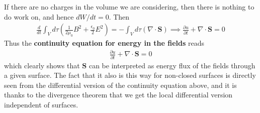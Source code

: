 \documentclass[a4paper]{article}
\begin{document}
    If there are no charges in the volume we are considering, then there is nothing to do work on, and hence \(dW / dt = 0\). Then 
    \begin{align*}
        \frac{d}{dt} \int_V d \tau \left( \frac{1}{2\mu _0} B^{2} + \frac{\epsilon_0}{2} E^{2}  \right) = - \int_V d \tau \left(\nabla \cdot \mathbf{S}\right) \implies \frac{\partial u}{\partial t} + \nabla \cdot \mathbf{S} = 0
    \end{align*}
    Thus the \textbf{continuity equation for energy in the fields} reads \begin{align*}
        \boxed{\frac{\partial u}{\partial t} + \nabla \cdot \mathbf{S} = 0} 
    \end{align*}
    which clearly shows that \(\mathbf{S}\) can be interpreted as energy flux of the fields through a given surface. The fact that it also is this way for non-closed surfaces is directly seen from the differential version of the continuity equation above, and it is thanks to the divergence theorem that we get the local differential version independent of surfaces.
    
    \newpage
    
\end{document}
